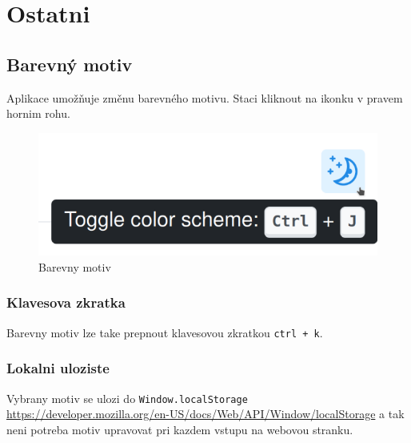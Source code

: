 
\section{Ostatni}\label{sec:ostatni}

\subsection{Barevný motiv}\label{subsec:barevny-motiv}
Aplikace umožňuje změnu barevného motivu.
Staci kliknout na ikonku v pravem hornim rohu.

\begin{figure}
    \centering
    \includegraphics[scale=0.4]{assets/images/color-scheme}
    \caption{Barevny motiv}\label{fig:barevny-motiv}
\end{figure}

\subsubsection{Klavesova zkratka}
Barevny motiv lze take prepnout klavesovou zkratkou \texttt{ctrl + k}.

\subsubsection{Lokalni uloziste}
Vybrany motiv se ulozi do \texttt{Window.localStorage}
\url{https://developer.mozilla.org/en-US/docs/Web/API/Window/localStorage}
a tak neni potreba motiv upravovat pri kazdem vstupu na webovou stranku.
